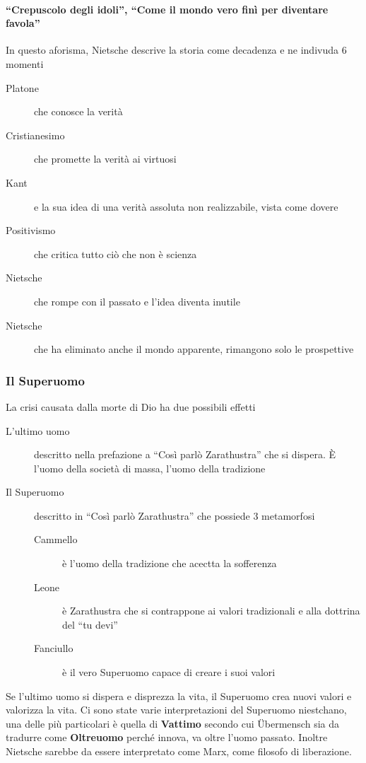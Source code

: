 \paragraph{``Crepuscolo degli idoli'', ``Come il mondo vero finì per diventare favola''}
In questo aforisma, Nietsche descrive la storia come decadenza e ne indivuda 6 momenti
\begin{description}
  \item[Platone] che conosce la verità
  \item[Cristianesimo] che promette la verità ai virtuosi
  \item[Kant] e la sua idea di una verità assoluta non realizzabile, vista come dovere
  \item[Positivismo] che critica tutto ciò che non è scienza
  \item[Nietsche] che rompe con il passato e l'idea diventa inutile
  \item[Nietsche] che ha eliminato anche il mondo apparente, rimangono solo le prospettive
\end{description}

\subsubsection{Il Superuomo}
La crisi causata dalla morte di Dio ha due possibili effetti
\begin{description}
  \item[L'ultimo uomo] descritto nella prefazione a ``Così parlò Zarathustra'' che si dispera. È 
    l'uomo della società di massa, l'uomo della tradizione
  \item[Il Superuomo] descritto in ``Così parlò Zarathustra'' che possiede 3 metamorfosi
    \begin{description}
      \item[Cammello] è l'uomo della tradizione che acectta la sofferenza
      \item[Leone] è Zarathustra che si contrappone ai valori tradizionali e alla dottrina del 
        ``tu devi''
      \item[Fanciullo] è il vero Superuomo capace di creare i suoi valori
    \end{description}
\end{description}
Se l'ultimo uomo si dispera e disprezza la vita, il Superuomo crea nuovi valori e valorizza la vita.
Ci sono state varie interpretazioni del Superuomo niestchano, una delle più particolari è quella di
\textbf{Vattimo} secondo cui Übermensch sia da tradurre come \textbf{Oltreuomo} perché innova,
va oltre l'uomo passato. Inoltre Nietsche sarebbe da essere interpretato come Marx, come filosofo
di liberazione.


